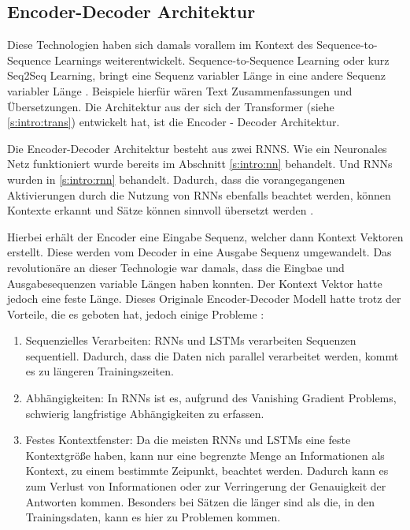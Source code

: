 \subsection{Encoder-Decoder Architektur}
\label{s:intro:edar}
Diese Technologien haben sich damals vorallem im Kontext des Sequence-to-Sequence Learnings weiterentwickelt. 
Sequence-to-Sequence Learning oder kurz Seq2Seq Learning, bringt eine Sequenz variabler Länge in eine andere
Sequenz variabler Länge \cite{sutskeverSequenceSequenceLearning2014}. Beispiele hierfür wären Text Zusammenfassungen und Übersetzungen. Die Architektur aus der sich
der Transformer (siehe \ref{s:intro:trans}) entwickelt hat, ist die Encoder - Decoder Architektur.\par

Die Encoder-Decoder Architektur besteht aus zwei RNNS. Wie ein Neuronales Netz funktioniert wurde bereits im 
Abschnitt \ref*{s:intro:nn} behandelt. Und RNNs wurden in \ref*{s:intro:rnn} behandelt. Dadurch, dass die 
vorangegangenen Aktivierungen durch die Nutzung von RNNs ebenfalls beachtet werden, können Kontexte 
erkannt und Sätze können sinnvoll übersetzt werden \cite{sutskeverSequenceSequenceLearning2014, bahdanauNeuralMachineTranslation2016}.\par
Hierbei erhält der Encoder eine Eingabe Sequenz, welcher dann Kontext Vektoren erstellt. Diese werden vom Decoder in eine Ausgabe Sequenz
umgewandelt. Das revolutionäre an dieser Technologie war damals, dass 
die Eingbae und Ausgabesequenzen variable Längen haben konnten. Der Kontext Vektor
hatte jedoch eine feste Länge.
Dieses Originale Encoder-Decoder Modell hatte trotz der Vorteile, die es geboten hat, jedoch einige Probleme \cite{sutskeverSequenceSequenceLearning2014, bahdanauNeuralMachineTranslation2016}: \par
\begin{enumerate}
    \item Sequenzielles Verarbeiten: RNNs und LSTMs verarbeiten Sequenzen 
sequentiell. Dadurch, dass die Daten nich parallel verarbeitet werden, kommt
es zu längeren Trainingszeiten.
    \item Abhängigkeiten: In RNNs ist es, aufgrund des Vanishing Gradient Problems, schwierig langfristige Abhängigkeiten zu erfassen.
    \item Festes Kontextfenster: Da die meisten RNNs und LSTMs eine feste
Kontextgröße haben, kann nur eine begrenzte Menge an Informationen als 
Kontext, zu einem bestimmte Zeipunkt, beachtet werden. Dadurch kann
es zum Verlust von Informationen oder zur Verringerung der Genauigkeit
der Antworten kommen. Besonders bei Sätzen die länger sind als die, in 
den Trainingsdaten, kann es hier zu Problemen kommen. 
\end{enumerate}
   
